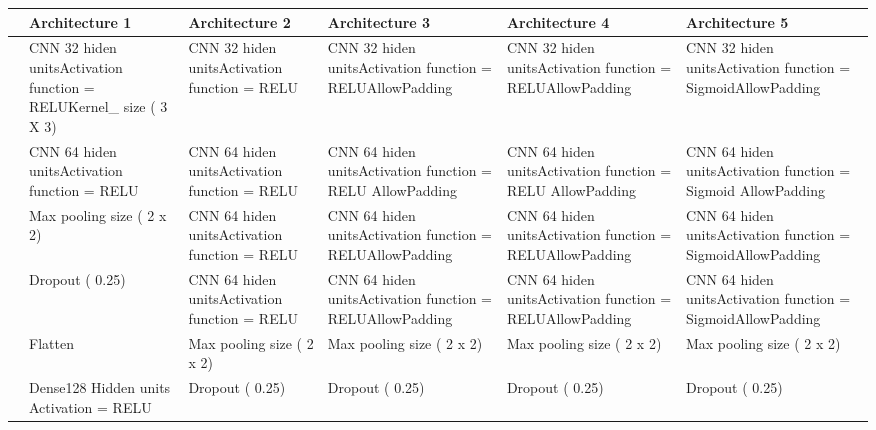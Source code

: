 \documentclass{article}
\begin{document}
\begin{adjustbox}{angle=90}
\begin{tabular}{|p{2cm}|p{3cm}|p{3cm}|p{3cm}|p{3cm}|p{3cm}|}
\hline
\textbf{}&\textbf{Architecture 1} & \textbf{Architecture 2}                                             & \textbf{Architecture 3}                       & \textbf{Architecture 4}                                    & \textbf{Architecture 5}                                                                                         \\ \hline
                        & CNN  32 hiden unitsActivation function = RELUKernel\_ size ( 3 X 3) & CNN  32 hiden unitsActivation function = RELU & CNN  32 hiden unitsActivation function = RELUAllowPadding  & CNN  32 hiden unitsActivation function = RELUAllowPadding  & CNN  32 hiden unitsActivation function = SigmoidAllowPadding  \\ \hline
                        & CNN  64 hiden unitsActivation function = RELU                       & CNN  64 hiden unitsActivation function = RELU & CNN  64 hiden unitsActivation function = RELU AllowPadding & CNN  64 hiden unitsActivation function = RELU AllowPadding & CNN  64 hiden unitsActivation function = Sigmoid AllowPadding \\ \hline
                        & Max pooling size ( 2 x 2)                                           & CNN  64 hiden unitsActivation function = RELU & CNN  64 hiden unitsActivation function = RELUAllowPadding  & CNN  64 hiden unitsActivation function = RELUAllowPadding  & CNN  64 hiden unitsActivation function = SigmoidAllowPadding  \\ \hline
                        & Dropout ( 0.25)                                                     & CNN  64 hiden unitsActivation function = RELU & CNN  64 hiden unitsActivation function = RELUAllowPadding  & CNN  64 hiden unitsActivation function = RELUAllowPadding  & CNN  64 hiden unitsActivation function = SigmoidAllowPadding  \\ \hline
                        & Flatten                                                             & Max pooling size ( 2 x 2)                     & Max pooling size ( 2 x 2)                                  & Max pooling size ( 2 x 2)                                  & Max pooling size ( 2 x 2)                                     \\ \hline
                        & Dense128 Hidden units Activation = RELU                             & Dropout ( 0.25)                               & Dropout ( 0.25)                                            & Dropout ( 0.25)                                            & Dropout ( 0.25)                                               \\ \hline

\end{tabular}
\end{adjustbox}
\end{document}
